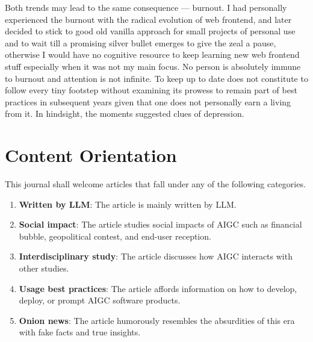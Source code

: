 Both trends may lead to the same consequence --- burnout.
I had personally experienced the burnout with the radical evolution of web frontend,
and later decided to stick to good old vanilla approach for small projects of personal use
and to wait till a promising silver bullet emerges to give the zeal a pause,
otherwise I would have no cognitive resource to keep learning new web frontend stuff
especially when it was not my main focus.
No person is absolutely immune to burnout and attention is not infinite.
To keep up to date does not constitute to follow every tiny footstep
without examining its prowess to remain part of best practices in subsequent years
given that one does not personally earn a living from it.
In hindsight, the moments suggested clues of depression.


\section{Content Orientation}
This journal shall welcome articles that fall under any of the following categories.

\begin{enumerate}
	\item \textbf{Written by LLM}: The article is mainly written by LLM.
	\item \textbf{Social impact}: The article studies social impacts of AIGC such as financial bubble, geopolitical contest, and end-user reception.
	\item \textbf{Interdisciplinary study}: The article discusses how AIGC interacts with other studies.
	\item \textbf{Usage best practices}: The article affords information on how to develop, deploy, or prompt AIGC software products.
	\item \textbf{Onion news}: The article humorously resembles the absurdities of this era with fake facts and true insights.
\end{enumerate}







\printbibliography

